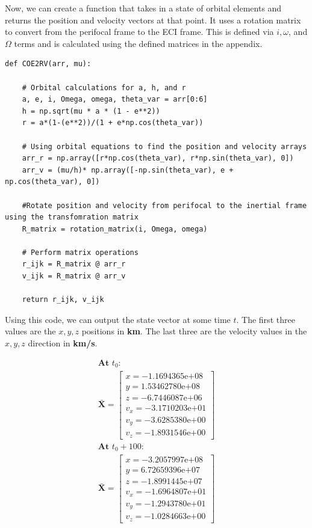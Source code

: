 \documentclass[12pt,twocolumn]{article}  %
\begin{document}
Now, we can create a function that takes in a state of orbital elements and returns 
the position and velocity vectors at that point. It uses a rotation matrix to convert from 
the perifocal frame to the ECI frame. This is defined via $i, \omega$, and $\Omega$ terms and is 
calculated using the defined matrices in the appendix.


\begin{lstlisting}   
def COE2RV(arr, mu):
    
    # Orbital calculations for a, h, and r
    a, e, i, Omega, omega, theta_var = arr[0:6]
    h = np.sqrt(mu * a * (1 - e**2))
    r = a*(1-(e**2))/(1 + e*np.cos(theta_var))
    
    # Using orbital equations to find the position and velocity arrays
    arr_r = np.array([r*np.cos(theta_var), r*np.sin(theta_var), 0])
    arr_v = (mu/h)* np.array([-np.sin(theta_var), e + np.cos(theta_var), 0])

    #Rotate position and velocity from perifocal to the inertial frame using the transfomration matrix
    R_matrix = rotation_matrix(i, Omega, omega)
   
    # Perform matrix operations
    r_ijk = R_matrix @ arr_r
    v_ijk = R_matrix @ arr_v
    
    return r_ijk, v_ijk
\end{lstlisting}
\vspace{0.35cm}
Using this code, we can output the state vector at some time $t$. The first three values 
are the $x,y,z$ positions in \textbf{km}. The last three are the velocity values in the $x,y,z$ direction 
in \textbf{km/s}.

\[
\begin{array}{c}
\textbf{At } t_0: \\
\mathbf{\bar{X}} =
\begin{bmatrix}
x = -1.1694365\mathrm{e}{+08} \\
y =  1.53462780\mathrm{e}{+08} \\
z = -6.7446087\mathrm{e}{+06} \\
v_x = -3.1710203\mathrm{e}{+01} \\
v_y = -3.6285380\mathrm{e}{+00} \\
v_z = -1.8931546\mathrm{e}{+00}
\end{bmatrix}
\\[7em] %
\textbf{At } t_0 + 100: \\
\mathbf{\bar{X}} =
\begin{bmatrix}
x = -3.2057997\mathrm{e}{+08} \\
y =  6.72659396\mathrm{e}{+07} \\
z = -1.8991445\mathrm{e}{+07} \\
v_x = -1.6964807\mathrm{e}{+01} \\
v_y = -1.2943780\mathrm{e}{+01} \\
v_z = -1.0284663\mathrm{e}{+00}
\end{bmatrix}
\end{array}
\]
\end{document}

